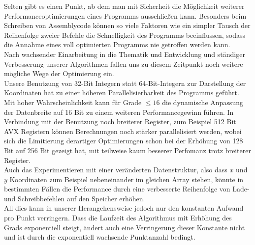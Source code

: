 \documentclass[course=erap]{aspdoc}
\begin{document}
Selten gibt es einen Punkt, ab dem man mit Sicherheit die Möglichkeit weiterer Performanceoptimierungen eines Programms ausschließen kann. Besonders beim Schreiben von Assemblycode können so viele Faktoren wie ein simpler Tausch der Reihenfolge zweier Befehle die Schnelligkeit des Programms beeinflussen, sodass die Annahme eines voll optimierten Programms nie getroffen werden kann. \\
Nach wachsender Einarbeitung in die Thematik und Entwicklung und ständiger Verbesserung unserer Algorithmen fallen uns zu diesem Zeitpunkt noch weitere mögliche Wege der Optimierung ein.\\
Unsere Benutzung von 32-Bit Integern statt 64-Bit-Integern zur Darstellung der Koordinaten hat zu einer höheren Parallelisierbarkeit des Programms geführt. Mit hoher Wahrscheinlichkeit kann für Grade $\leq 16$ die dynamische Anpassung der Datenbreite auf 16 Bit zu einem weiteren Performancegewinn führen. In Verbindung mit der Benutzung noch breiterer Register, zum Beispiel 512 Bit AVX Registern können Berechnungen noch stärker parallelisiert werden, wobei sich die  Limitierung derartiger Optimierungen schon bei der Erhöhung von 128 Bit auf 256 Bit gezeigt hat, mit teilweise kaum besserer Perfomanz trotz breiterer Register. \\
Auch das Experimentieren mit einer veränderten Datenstruktur, also dass $x$ und $y$ Koordinaten zum Beispiel nebeneinander im gleichen Array stehen, könnte in bestimmten Fällen die Performance durch eine verbesserte Reihenfolge von Lade- und Schreibbefehlen auf den Speicher erhöhen. \\
All dies kann in unserer Herangehensweise jedoch nur den konstanten Aufwand pro Punkt verringern. Dass die Laufzeit des Algorithmus mit Erhöhung des Grads exponentiell steigt, ändert auch eine Verringerung dieser Konstante nicht und ist durch die exponentiell wachsende Punktanzahl bedingt.




{}
\end{document}
